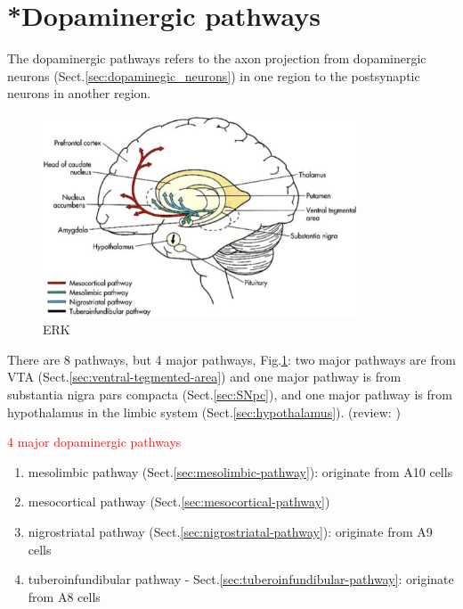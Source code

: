 \section{*Dopaminergic pathways}
\label{sec:dopaminegic_pathways}

The dopaminergic pathways refers to the axon projection from dopaminergic
neurons (Sect.\ref{sec:dopaminegic_neurons}) in one region to the postsynaptic
neurons in another region.

\begin{figure}[hbt]
  \centerline{\includegraphics[height=6cm,
    angle=0]{./images/dopamine-pathways.eps}}
\caption{ERK }
\label{fig:dopaminergic-pathway}
\end{figure}


There are 8 pathways, but 4 major pathways, Fig.\ref{fig:dopaminergic-pathway}:
two major pathways are from VTA (Sect.\ref{sec:ventral-tegmented-area}) and one
major pathway is from substantia nigra pars compacta (Sect.\ref{sec:SNpc}), and
one major pathway is from hypothalamus in the limbic system
(Sect.\ref{sec:hypothalamus}).
(review: \citep{beaulieu2011})


\textcolor{red}{4 major dopaminergic pathways}
\begin{enumerate}
  \item mesolimbic pathway (Sect.\ref{sec:mesolimbic-pathway}): originate from
  A10 cells

  \item mesocortical pathway (Sect.\ref{sec:mesocortical-pathway})
  
  \item nigrostriatal pathway (Sect.\ref{sec:nigrostriatal-pathway}): originate
  from A9 cells
  
  
  \item tuberoinfundibular pathway - Sect.\ref{sec:tuberoinfundibular-pathway}:
  originate from A8 cells
\end{enumerate}

